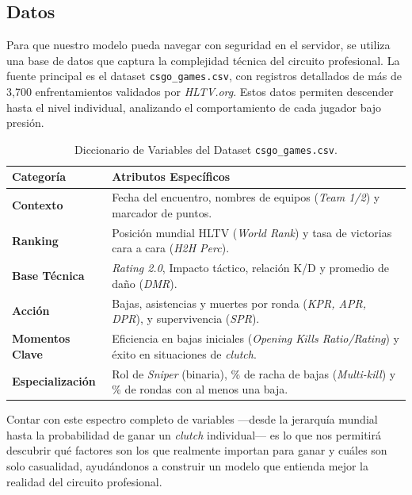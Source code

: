 \documentclass[twocolumn,10pt]{article}
\begin{document}
\subsection{Datos}
Para que nuestro modelo pueda navegar con seguridad en el servidor, se utiliza una base de datos que captura la complejidad técnica del circuito profesional. La fuente principal es el dataset \texttt{csgo\_games.csv}, con registros detallados de más de 3,700 enfrentamientos validados por \textit{HLTV.org}. Estos datos permiten descender hasta el nivel individual, analizando el comportamiento de cada jugador bajo presión.

\begin{table}[!ht]
\centering
\caption{Diccionario de Variables del Dataset \texttt{csgo\_games.csv}.}
\label{tab:data_dictionary}
\begin{tabular}{lp{5.2cm}}
\toprule
\textbf{Categoría} & \textbf{Atributos Específicos} \\
\midrule
\textbf{Contexto} & Fecha del encuentro, nombres de equipos (\textit{Team 1/2}) y marcador de puntos. \\
\textbf{Ranking} & Posición mundial HLTV (\textit{World Rank}) y tasa de victorias cara a cara (\textit{H2H Perc}). \\
\textbf{Base Técnica} & \textit{Rating 2.0}, Impacto táctico, relación K/D y promedio de daño (\textit{DMR}). \\
\textbf{Acción} & Bajas, asistencias y muertes por ronda (\textit{KPR, APR, DPR}), y supervivencia (\textit{SPR}). \\
\textbf{Momentos Clave} & Eficiencia en bajas iniciales (\textit{Opening Kills Ratio/Rating}) y éxito en situaciones de \textit{clutch}. \\
\textbf{Especialización} & Rol de \textit{Sniper} (binaria), \% de racha de bajas (\textit{Multi-kill}) y \% de rondas con al menos una baja. \\
\bottomrule
\end{tabular}
\end{table}

Contar con este espectro completo de variables —desde la jerarquía mundial hasta la probabilidad de ganar un \textit{clutch} individual— es lo que nos permitirá descubrir qué factores son los que realmente importan para ganar y cuáles son solo casualidad, ayudándonos a construir un modelo que entienda mejor la realidad del circuito profesional.
\end{document}
